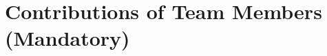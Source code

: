 \documentclass[letterpaper]{article}
\newcommand{\mypar}[1]{{\bf #1.}}
\begin{document}









\newpage
\clearpage
\section{Contributions of Team Members (Mandatory)}

\end{document}

